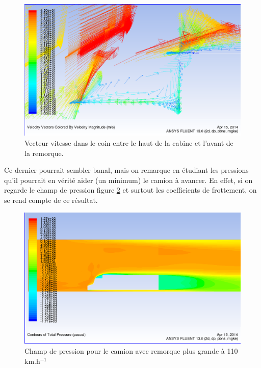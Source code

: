 \begin{figure}[!h]
\centering
\includegraphics[scale=0.4]{resultsCx/remorque2-hautCabineAbsorption.png}
\caption{Vecteur vitesse dans le coin entre le haut de la cabine et l'avant de la remorque.}
\label{figRem2Vit110-coin}
\end{figure}
\clearpage

Ce dernier pourrait sembler banal, mais on remarque en étudiant les pressions qu'il pourrait en vérité aider (un minimum) le camion à avancer. En effet, si on regarde le champ de pression figure \ref{figRem2Pres110} et surtout les coefficients de frottement, on se rend compte de ce résultat.
\begin{figure}[!h]
\centering
\includegraphics[scale=0.4]{resultsCx/remorque2-110_pressure.png}
\caption{Champ de pression pour le camion avec remorque plus grande à 110 km.h$^{-1}$}
\label{figRem2Pres110}
\end{figure}

